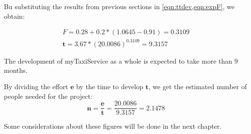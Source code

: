 Bu substituting the results from previous sections in \cref{eqn:ttdev,eqn:expF}, we obtain:

\begin{gather}
	F = 0.28 + 0.2 * \left( 1.0645 - 0.91 \right) = 0.3109
	\\
	\mathbf{t} = 3.67 * {\left( 20.0086 \right)}^{0.3109} = 9.3157
\end{gather}


The development of myTaxiService as a whole is expected to take more than 9 months.

By dividing the effort $ \mathbf{e} $ by the time to develop $ \mathbf{t} $, we get the estimated number of people needed for the project:
\begin{equation}
	\mathbf{n} = \frac{\mathbf{e}}{\mathbf{t}} = \frac{20.0086}{9.3157} = 2.1478
\end{equation}

Some considerations about these figures will be done in the next chapter. 









